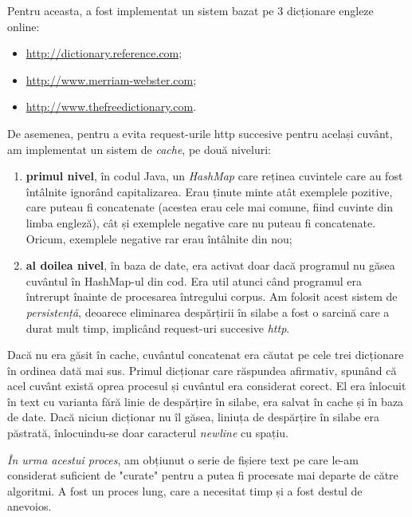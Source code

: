 Pentru aceasta, a fost implementat un sistem bazat pe 3 dicționare engleze online:

\begin{itemize}
\item \url{http://dictionary.reference.com};
\item \url{http://www.merriam-webster.com};
\item \url{http://www.thefreedictionary.com}.
\end{itemize}

De asemenea, pentru a evita request-urile http succesive pentru același cuvânt, am implementat un sistem de \textit{cache}, pe două niveluri:

\begin{enumerate}
\item \textbf{primul nivel}, în codul Java, un \textit{HashMap} care reținea cuvintele care au fost întâlnite ignorând capitalizarea. Erau ținute minte atât exemplele pozitive, care puteau fi concatenate (acestea erau cele mai comune, fiind cuvinte din limba engleză), cât și exemplele negative care nu puteau fi concatenate. Oricum, exemplele negative rar erau întâlnite din nou;

\item \textbf{al doilea nivel}, în baza de date, era activat doar dacă programul nu găsea cuvântul în HashMap-ul din cod. Era util atunci când programul era întrerupt înainte de procesarea întregului corpus. Am folosit acest sistem de \textit{persistență}, deoarece eliminarea despărțirii în silabe a fost o sarcină care a durat mult timp, implicând request-uri succesive \textit{http}. 

\end{enumerate}

Dacă nu era găsit în cache, cuvântul concatenat era căutat pe cele trei dicționare în ordinea dată mai sus. Primul dicționar care răspundea afirmativ, spunând că acel cuvânt există oprea procesul și cuvântul era considerat corect. El era înlocuit în text cu varianta fără linie de despărțire în silabe, era salvat în cache și în baza de date. Dacă niciun dicționar nu îl găsea, liniuța de despărțire în silabe era păstrată, înlocuindu-se doar caracterul \textit{newline} cu spațiu.

\textit{În urma acestui proces}, am obțiunut o serie de fișiere text pe care le-am considerat suficient de "curate" pentru a putea fi procesate mai departe de către algoritmi. A fost un proces lung, care a necesitat timp și a fost destul de anevoios.

